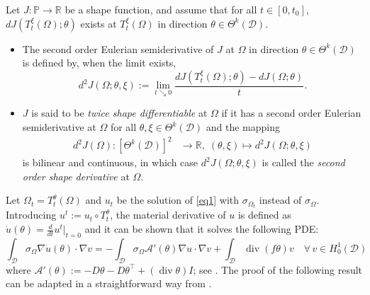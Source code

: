 \documentclass[preprint,9pt]{elsarticle}
\newcommand{\Om}{\Omega}
\newcommand{\divv}{\operatorname{div}}
\newcommand{\ta}{\theta}
\newcommand{\R}{\mathbb{R}}
\newcommand{\tz}{t_0}
\begin{document}
\begin{definition}\label{def:euler_shape_hessian}
Let $J : \mathds{P} \rightarrow \R$ be a shape function, and assume that for all $t\in [0,\tz]$, $d J(T_t^\xi(\Om);\ta)$ exists at $T_t^\xi(\Om)$ in direction $\ta \in \Theta^k(\mathcal{D})$.
\begin{itemize}
\item[(i)] The second order Eulerian semiderivative of $J$ at $\Omega$ in direction $\ta \in \Theta^k(\mathcal{D})$
is defined by, when the limit exists,
\begin{equation}\label{eq5}
d^2 J(\Omega;\ta,\xi):= \lim_{t \searrow 0}\frac{d J(T_t^\xi(\Omega);\ta) - d J(\Omega;\ta)}{t}.
\end{equation}
\item[(i)] $J$ is said to be \textit{twice shape differentiable} at $\Omega$ if it has a second order Eulerian semiderivative at $\Omega$ for all $\ta,\xi \in \Theta^k(\mathcal{D})$ and the mapping
\begin{align*}
d^2 J(\Omega): [\Theta^k(\mathcal{D})]^2 &  \to \R,\; (\ta,\xi)     \mapsto d^2 J(\Omega;\ta,\xi)
\end{align*}
is bilinear and continuous, in which case $d^2 J(\Omega;\ta,\xi)$ is called the \textit{second order shape derivative} at $\Omega$.
\end{itemize}
\end{definition}


Let $\Om_t = T_t^\theta(\Om)$ and $u_t$ be the solution of \eqref{eq1} with $\sigma_{\Om_t}$ instead of $\sigma_\Om$. 
Introducing $u^t:=u_t\circ T_t^\theta$, the material derivative  of $u$ is defined as 
$\dot u(\theta) = \frac{d}{dt} u^t|_{t=0}$ and it can be shown that it solves the following PDE:
\begin{equation}
	\label{eq:matder}  \int_{\mathcal{D}} \sigma_{\Omega} \nabla \dot u(\theta) \cdot \nabla v =
	- \int_{\mathcal{D}} \sigma_{\Omega} \mathcal{A}'(\ta)\nabla u \cdot \nabla v
	+ \int_{\mathcal{D}} \divv(f\ta) v
	\quad
	\forall \, v \in  H^1_{0}(\mathcal{D})
\end{equation}
where $\mathcal{A}'(\ta) := -D\ta -D\ta^\top + (\divv\ta)I$; see \cite[Section~6]{LAURAIN2020328}.
The proof of the following result can be adapted in a straightforward way from \cite[Proposition~7]{LAURAIN2020328}.
\end{document}
